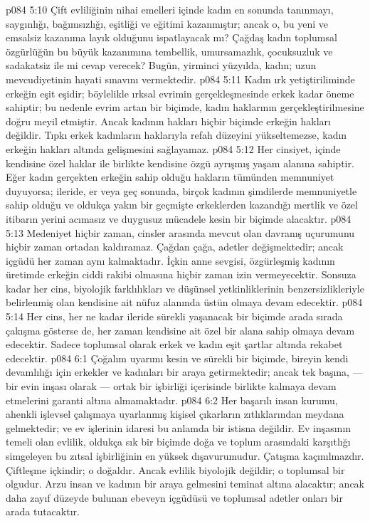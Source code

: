 \vs p084 5:10 Çift evliliğinin nihai emelleri içinde kadın en sonunda tanınmayı, saygınlığı, bağımsızlığı, eşitliği ve eğitimi kazanmıştır; ancak o, bu yeni ve emsalsiz kazanıma layık olduğunu ispatlayacak mı? Çağdaş kadın toplumsal özgürlüğün bu büyük kazanımına tembellik, umursamazlık, çocuksuzluk ve sadakatsiz ile mi cevap verecek? Bugün, yirminci yüzyılda, kadın; uzun mevcudiyetinin hayati sınavını vermektedir.
\vs p084 5:11 Kadın ırk yetiştiriliminde erkeğin eşit eşidir; böylelikle ırksal evrimin gerçekleşmesinde erkek kadar öneme sahiptir; bu nedenle evrim artan bir biçimde, kadın haklarının gerçekleştirilmesine doğru meyil etmiştir. Ancak kadının hakları hiçbir biçimde erkeğin hakları değildir. Tıpkı erkek kadınların haklarıyla refah düzeyini yükseltemezse, kadın erkeğin hakları altında gelişmesini sağlayamaz.
\vs p084 5:12 Her cinsiyet, içinde kendisine özel haklar ile birlikte kendisine özgü ayrışmış yaşam alanına sahiptir. Eğer kadın gerçekten erkeğin sahip olduğu hakların tümünden memnuniyet duyuyorsa; ileride, er veya geç sonunda, birçok kadının şimdilerde memnuniyetle sahip olduğu ve oldukça yakın bir geçmişte erkeklerden kazandığı mertlik ve özel itibarın yerini acımasız ve duygusuz mücadele kesin bir biçimde alacaktır.
\vs p084 5:13 Medeniyet hiçbir zaman, cinsler arasında mevcut olan davranış uçurumunu hiçbir zaman ortadan kaldıramaz. Çağdan çağa, adetler değişmektedir; ancak içgüdü her zaman aynı kalmaktadır. İçkin anne sevgisi, özgürleşmiş kadının üretimde erkeğin ciddi rakibi olmasına hiçbir zaman izin vermeyecektir. Sonsuza kadar her cins, biyolojik farklılıkları ve düşünsel yetkinliklerinin benzersizlikleriyle belirlenmiş olan kendisine ait nüfuz alanında üstün olmaya devam edecektir.
\vs p084 5:14 Her cins, her ne kadar ileride sürekli yaşanacak bir biçimde arada sırada çakışma gösterse de, her zaman kendisine ait özel bir alana sahip olmaya devam edecektir. Sadece toplumsal olarak erkek ve kadın eşit şartlar altında rekabet edecektir.
\vs p084 6:1 Çoğalım uyarımı kesin ve sürekli bir biçimde, bireyin kendi devamlılığı için erkekler ve kadınları bir araya getirmektedir; ancak tek başına, --- bir evin inşası olarak --- ortak bir işbirliği içerisinde birlikte kalmaya devam etmelerini garanti altına almamaktadır.
\vs p084 6:2 Her başarılı insan kurumu, ahenkli işlevsel çalışmaya uyarlanmış kişisel çıkarların zıtlıklarından meydana gelmektedir; ve ev işlerinin idaresi bu anlamda bir istisna değildir. Ev inşasının temeli olan evlilik, oldukça sık bir biçimde doğa ve toplum arasındaki karşıtlığı simgeleyen bu zıtsal işbirliğinin en yüksek dışavurumudur. Çatışma kaçınılmazdır. Çiftleşme içkindir; o doğaldır. Ancak evlilik biyolojik değildir; o toplumsal bir olgudur. Arzu insan ve kadının bir araya gelmesini teminat altına alacaktır; ancak daha zayıf düzeyde bulunan ebeveyn içgüdüsü ve toplumsal adetler onları bir arada tutacaktır.
